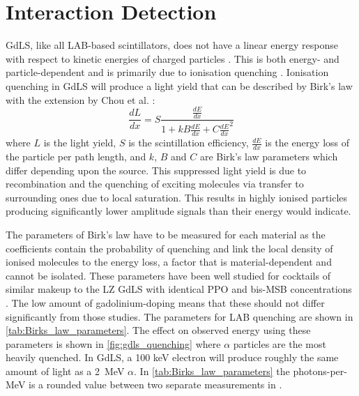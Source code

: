 \section{Interaction Detection}
\label{sec:od_physics}
\par
GdLS, like all LAB-based scintillators, does not have a linear energy response with respect to kinetic energies of charged particles \cite{nonlinear_gdls_ref}.
This is both energy- and particle-dependent and is primarily due to ionisation quenching \cite{lab_quenching_theory_ref}.
Ionisation quenching in GdLS will produce a light yield that can be described by Birk's law \cite{birks_law_ref} with the extension by Chou et al. \cite{generalised_birks_ref}:
\begin{equation} 
    \frac{dL}{dx} = S \frac{\frac{dE}{dx}}{1 + kB\frac{dE}{dx} + C\frac{dE}{dx}^2}
    \label{eq:birkslaw}
\end{equation}
where $L$ is the light yield, $S$ is the scintillation efficiency, $\frac{dE}{dx}$ is the energy loss of the particle per path length, and $k$, $B$ and $C$ are Birk's law parameters which differ depending upon the source.
This suppressed light yield is due to recombination and the quenching of exciting molecules via transfer to surrounding ones due to local saturation.
This results in highly ionised particles producing significantly lower amplitude signals than their energy would indicate.

\par
The parameters of Birk's law have to be measured for each material as the coefficients contain the probability of quenching and link the local density of ionised molecules to the energy loss, a factor that is material-dependent and cannot be isolated.
These parameters have been well studied for cocktails of similar makeup to the LZ GdLS with identical PPO and bis-MSB concentrations \cite{ls_alpha_quenching_ref,ls_proton_quenching_ref}.
The low amount of gadolinium-doping means that these should not differ significantly from those studies.
The parameters for LAB quenching are shown in \autoref{tab:Birks_law_parameters}.
The effect on observed energy using these parameters is shown in \autoref{fig:gdls_quenching} where $\alpha$ particles are the most heavily quenched.
In GdLS, a 100 keV electron will produce roughly the same amount of light as a 2~MeV $\alpha$.
In \autoref{tab:Birks_law_parameters} the photons-per-MeV is a rounded value between two separate measurements in \cite{scotthaselschwardt_thesis_ref}.

